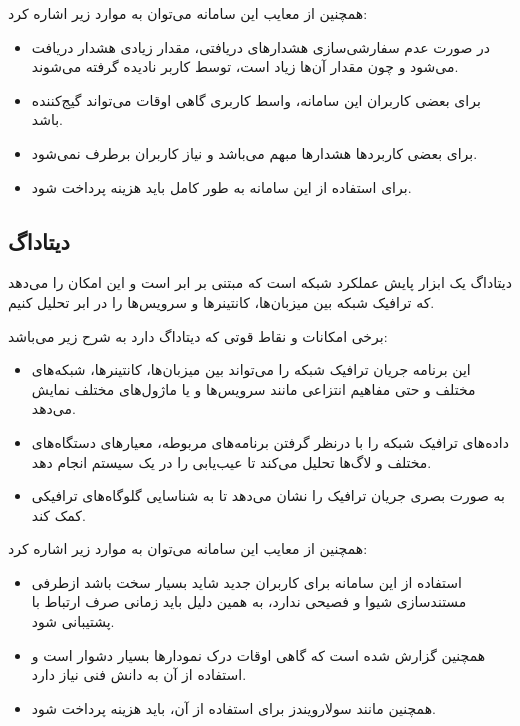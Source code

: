 همچنین از معایب این سامانه می‌توان به موارد زیر اشاره کرد:



\begin{itemize}
    \item در صورت عدم سفارشی‌سازی هشدارهای دریافتی، مقدار زیادی هشدار دریافت می‌شود و چون مقدار آن‌ها زیاد است، توسط کاربر نادیده گرفته می‌شوند.
    \item برای بعضی کاربران این سامانه، واسط کاربری گاهی اوقات می‌تواند گیج‌کننده باشد.
    \item برای بعضی کاربردها هشدارها مبهم می‌باشد و نیاز کاربران برطرف نمی‌شود.
    \item برای استفاده از این سامانه به طور کامل باید هزینه پرداخت شود.
\end{itemize}


\subsection{دیتاداگ}

دیتاداگ یک ابزار پایش عملکرد شبکه است که مبتنی بر ابر است و این امکان را می‌دهد که ترافیک شبکه بین میزبان‌ها، کانتینرها و سرویس‌ها را در ابر تحلیل کنیم\cite{noauthor_what_nodate}.

\newpage
برخی امکانات و نقاط قوتی که دیتاداگ دارد به شرح زیر می‌باشد:

\begin{itemize}
    \item این برنامه جریان ترافیک شبکه را می‌تواند بین میزبان‌ها، کانتینرها، شبکه‌های مختلف و حتی مفاهیم انتزاعی مانند سرویس‌ها و یا ماژول‌های مختلف نمایش می‌دهد. 
    \item داده‌های ترافیک شبکه را با درنظر گرفتن برنامه‌های مربوطه، معیارهای دستگاه‌های مختلف و لاگ‌ها تحلیل می‌کند تا عیب‌یابی را در یک سیستم انجام دهد.
    \item به صورت بصری جریان ترافیک را نشان می‌دهد تا به شناسایی گلوگاه‌های ترافیکی کمک کند.
\end{itemize}

همچنین از معایب این سامانه می‌توان به موارد زیر اشاره کرد:


\begin{itemize}
    \item استفاده از این سامانه برای کاربران جدید شاید بسیار سخت باشد ازطرفی مستندسازی شیوا و فصیحی ندارد، به همین دلیل باید زمانی صرف ارتباط با پشتیبانی شود.
    \item همچنین گزارش شده است که گاهی اوقات درک نمودارها بسیار دشوار است و استفاده از آن به دانش فنی نیاز دارد.
    \item همچنین مانند سولارویندز برای استفاده از آن، باید هزینه پرداخت شود.
\end{itemize}


